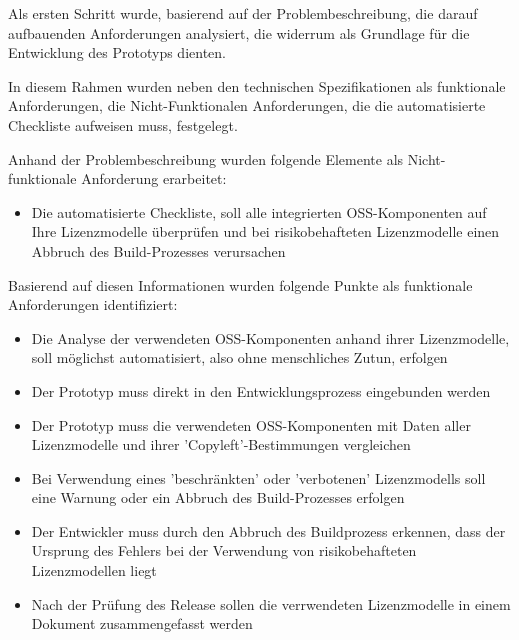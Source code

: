 
Als ersten Schritt wurde, basierend auf der Problembeschreibung, die darauf aufbauenden Anforderungen analysiert, die widerrum als Grundlage für die Entwicklung des Prototyps dienten. 

In diesem Rahmen wurden neben den technischen Spezifikationen als funktionale Anforderungen, die Nicht-Funktionalen Anforderungen, die die automatisierte Checkliste aufweisen muss, festgelegt.

Anhand der Problembeschreibung wurden folgende Elemente als Nicht-funktionale Anforderung erarbeitet: 

\begin{itemize}
    \item Die automatisierte Checkliste, soll alle integrierten OSS-Komponenten auf Ihre Lizenzmodelle überprüfen und bei risikobehafteten Lizenzmodelle einen Abbruch des Build-Prozesses verursachen
\end{itemize}

Basierend auf diesen Informationen wurden folgende Punkte als funktionale Anforderungen identifiziert: 

\begin{itemize}
    \item Die Analyse der verwendeten OSS-Komponenten anhand ihrer Lizenzmodelle, soll möglichst automatisiert, also ohne menschliches Zutun, erfolgen
    \item Der Prototyp muss direkt in den Entwicklungsprozess  eingebunden werden 
    \item Der Prototyp muss die verwendeten OSS-Komponenten mit Daten aller Lizenzmodelle und ihrer 'Copyleft'-Bestimmungen vergleichen 
    \item Bei Verwendung eines 'beschränkten' oder 'verbotenen' Lizenzmodells soll eine Warnung oder ein Abbruch des Build-Prozesses erfolgen      
    \item Der Entwickler muss durch den Abbruch des Buildprozess erkennen, dass der Ursprung des Fehlers bei der Verwendung von risikobehafteten Lizenzmodellen liegt
    \item Nach der Prüfung des Release sollen die verrwendeten Lizenzmodelle in einem Dokument zusammengefasst werden
\end{itemize}

